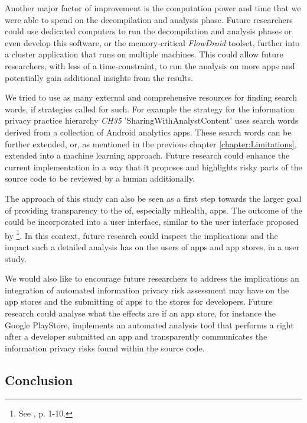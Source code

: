 Another major factor of improvement is the computation power and time that we were able to spend on the decompilation and analysis phase.
Future researchers could use dedicated computers to run the decompilation and analysis phases or even develop this software, or the memory-critical \textit{FlowDroid} toolset, further into a cluster application that runs on multiple machines.
This could allow future researchers, with less of a time-constraint, to run the analysis on more apps and potentially gain additional insights from the results.

We tried to use as many external and comprehensive resources for finding search words, if strategies called for such.
For example the strategy for the information privacy practice hierarchy \textit{CH35} 'SharingWithAnalystContent' uses search words derived from a collection of Android analytics apps.
These search words can be further extended, or, as mentioned in the previous chapter \ref{chapter:Limitations}, extended into a machine learning approach. 
Future research could enhance the current implementation in a way that it proposes and highlights risky parts of the source code to be reviewed by a human additionally.

The approach of this study can also be seen as a first step towards the larger goal of providing transparency to the \ipr of, especially mHealth, apps.
The outcome of the \aiprat could be incorporated into a user interface, similar to the user interface proposed by \textcite{Bruggemann2016}\footnote{See \cite{Bruggemann2016}, p. 1-10.}.
In this context, future research could inspect the implications and the impact such a detailed \ipr analysis has on the users of apps and app stores, in a user study.

We would also like to encourage future researchers to address the implications an integration of automated information privacy risk assessment may have on the app stores and the submitting of apps to the stores for developers.
Future research could analyse what the effects are if an app store, for instance the Google PlayStore, implements an automated \ipr analysis tool that performs a \sca right after a developer submitted an app and transparently communicates the information privacy risks found within the source code.

\subsection{Conclusion}